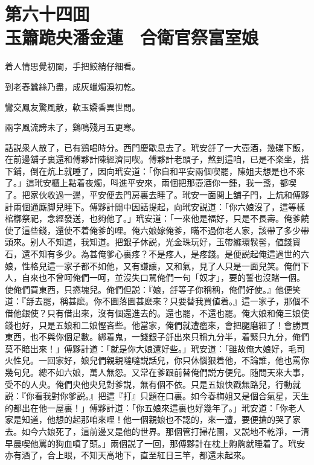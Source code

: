 
\chapter*{第六十四囬　\\玉簫跪央潘金蓮　合衛官祭富室娘}


\begin{myquote}
着人情思覺初闌，手把鮫綃仔細看。

到老春蠶絲乃盡，成灰蠟燭淚初乾。

鸞交鳳友驚風散，軟玉嬌香異世問。

兩字風流誇未了，鷄鳴殘月五更寒。
\end{myquote}

話説衆人散了，已有鷄唱時分。西門慶歇息去了。玳安㧱了一大壺酒，幾碟下飯，在前邊舖子裏還和傅夥計陳經濟同喫。傅夥計老頭子，熬到這咱，已是不楽坐，搭下鋪，倒在炕上就睡了，因向玳安道：「你自和平安兩個喫罷，陳姐夫想是也不來了。」這玳安櫃上點着夜燭，呌進平安來，兩個把那壺酒你一鍾，我一盞，都喫了。把家伙收過一邊，平安便去門房裏去睡了。玳安一面関上舖子門，上炕和傅夥計兩個通廝脚兒睡下。傅夥計閒中因話提起，向玳安説道：「你六娘沒了，這等樣棺槨祭祀，念經發送，也夠他了。」玳安道：「一來他是福好，只是不長壽。俺爹饒使了這些錢，還使不着俺爹的哩。俺六娘嫁俺爹，瞞不過你老人家，該帶了多少帶頭來。别人不知道，我知道。把銀子休説，光金珠玩好，玉帶縧環䯼髻，値錢寳石，還不知有多少。為甚俺爹心裏疼？不是疼人，是疼錢。是便説起俺這過世的六娘，性格兒這一家子都不如他，又有謙讓，又和氣，見了人只是一面兒笑。俺們下人，自來也不曾呵俺們一呵，並沒失口駡俺們一句「奴才」，要的誓也沒賭一個。使俺們買東西，只撚塊兒。俺們但説：『娘，㧱等子你稱稱，俺們好使。』他便笑道：『㧱去罷，稱甚麽。你不圖落圖甚麽來？只要替我買値着。』這一家子，那個不借他銀使？只有借出來，沒有個還進去的。還也罷，不還也罷。俺大娘和俺三娘使錢也好，只是五娘和二娘慳吝些。他當家，俺們就遭瘟來，會把腿磨細了！會勝買東西，也不與你個足數。綁着鬼，一錢銀子㧱出來只稱九分半，着緊只九分，俺們莫不賠出來！」傅夥計道：「就是你大娘還好些。」玳安道：「雖故俺大娘好，毛司火性兒。一回家好，娘兒們親親噠噠説話兒，你只休惱狠着他，不論誰，他也罵你幾句兒。總不如六娘，萬人無怨。又常在爹跟前替俺們説方便兒。随問天來大事，受不的人央。俺們央他央兒對爹説，無有個不依。只是五娘快戳無路兒，行動就説：『你看我對你爹説。』把這『打』只題在口裏。如今春梅姐又是個合氣星，天生的都出在他一屋裏！」傅夥計道：「你五娘來這裏也好幾年了。」玳安道：「你老人家是知道，他想的起那咱來哩！他一個親娘也不認的，來一遭，要便搶的哭了家去。如今六娘死了，這前邊又是他的世界。那個管打掃花園，又説地不乾淨，一清早晨喫他罵的狗血噴了頭。」兩個説了一回，那傅夥計在枕上齁齁就睡着了。玳安亦有酒了，合上眼，不知天高地下，直至紅日三竿，都還未起來。

